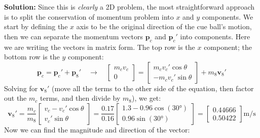 \begin{example}
  \textbf{Solution:} Since this is \emph{clearly} a 2D problem, the most
  straightforward approach is to split the conservation of momentum problem
  into $x$ and $y$ components. We start by defining the $x$ axis to be the
  original direction of the cue ball's motion, then we can separate the
  momentum vectors $\bm p_c$ and  $\bm p_c'$ into components. Here we are
  writing the vectors in matrix form. The top row is the $x$ component; the
  bottom row is the $y$ component:
  \begin{displaymath}
    \bm p_c =\bm p_c' + \bm p_8'\quad\longrightarrow\quad
    \left[\begin{matrix}
        m_cv_c\\0
      \end{matrix}\right]
    =
    \left[\begin{matrix}
        m_cv_c'\cos\theta\\
        -m_cv_c'\sin\theta
      \end{matrix}\right]
    + m_8\bm v_8'
  \end{displaymath}
  Solving for $\bm v_8'$ (move all the terms to the other side of the equation,
  then factor out the $m_c$ terms, and then divide by $m_8$), we get:
  \begin{displaymath}
    \bm v_8'=\frac{m_c}{m_8}
    \left[\begin{matrix}
        v_c-v_c'\cos\theta\\
        v_c'\sin\theta
      \end{matrix}\right]
    =\frac{0.17}{0.16}    
    \left[\begin{matrix}
        1.3-0.96\cos(\ang{30})\\
        0.96\sin(\ang{30})
      \end{matrix}\right]
    =
    \left[\begin{matrix}
        0.44666\\
        0.50422
      \end{matrix}\right]
    \si{\metre\per\second}
  \end{displaymath}
  Now we can find the magnitude and direction of the vector:
  

\end{example}
